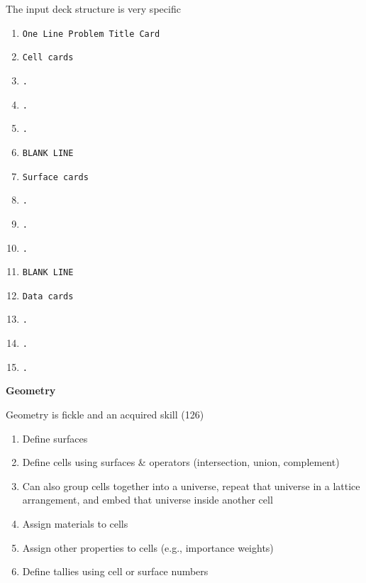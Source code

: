 \documentclass[aspectratio=1610,pdftex,dvipsnames,compress,xcolor={dvipsnames}]{beamer}
\begin{document}
\begin{frame}{The input deck structure is very specific}
    \begin{enumerate}[series=outerlist,topsep=0pt,itemsep=0pt,leftmargin=*,label=(\arabic*)]
        \item[]\texttt{One Line Problem Title Card}
        \item[]\texttt{Cell cards}
        \item[]\texttt{.}
        \item[]\texttt{.}
        \item[]\texttt{.}
        \item[]\texttt{BLANK LINE}
        \item[]\texttt{Surface cards}
        \item[]\texttt{.}
        \item[]\texttt{.}
        \item[]\texttt{.}
        \item[]\texttt{BLANK LINE}
        \item[]\texttt{Data cards}
        \item[]\texttt{.}
        \item[]\texttt{.}
        \item[]\texttt{.}
    \end{enumerate}
\end{frame}


\begin{frame}[plain]{}
    \centering\LARGE\textbf{Geometry}
\end{frame}


\addtocounter{framenumber}{-1} 
\begin{frame}{Geometry is fickle and an acquired skill (126)}
    \begin{enumerate}[series=outerlist,topsep=0pt,itemsep=21pt,leftmargin=*,label=(\arabic*)]
        \item[]Define surfaces
        \item[]Define cells using surfaces \& operators (intersection, union, complement)
        \item[]Can also group cells together into a universe, repeat that universe in a lattice arrangement, and embed that universe inside another cell
        \item[]Assign materials to cells
        \item[]Assign other properties to cells (e.g., importance weights)
        \item[]Define tallies using cell or surface numbers
    \end{enumerate}
\end{frame}
\end{document}

